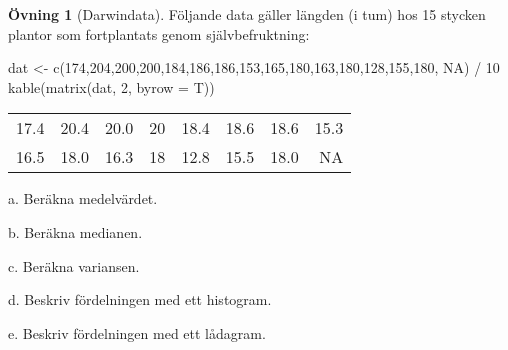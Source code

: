 \documentclass[
]{book}
\newenvironment{Shaded}{\begin{snugshade}}{\end{snugshade}}
\newcommand{\AttributeTok}[1]{\textcolor[rgb]{0.77,0.63,0.00}{#1}}
\newcommand{\ConstantTok}[1]{\textcolor[rgb]{0.00,0.00,0.00}{#1}}
\newcommand{\DecValTok}[1]{\textcolor[rgb]{0.00,0.00,0.81}{#1}}
\newcommand{\FunctionTok}[1]{\textcolor[rgb]{0.00,0.00,0.00}{#1}}
\newcommand{\NormalTok}[1]{#1}
\newcommand{\OtherTok}[1]{\textcolor[rgb]{0.56,0.35,0.01}{#1}}
\newcommand{\SpecialCharTok}[1]{\textcolor[rgb]{0.00,0.00,0.00}{#1}}
\theoremstyle{definition}
\theoremstyle{definition}
\theoremstyle{definition}
\newtheorem{exercise}{Övning}[chapter]
\theoremstyle{definition}
\theoremstyle{remark}
\begin{document}
\begin{exercise}[Darwindata]
Följande data gäller längden (i tum) hos 15 stycken plantor som fortplantats genom självbefruktning:

\begin{Shaded}
\begin{Highlighting}[]
\NormalTok{dat }\OtherTok{\textless{}{-}} \FunctionTok{c}\NormalTok{(}\DecValTok{174}\NormalTok{,}\DecValTok{204}\NormalTok{,}\DecValTok{200}\NormalTok{,}\DecValTok{200}\NormalTok{,}\DecValTok{184}\NormalTok{,}\DecValTok{186}\NormalTok{,}\DecValTok{186}\NormalTok{,}\DecValTok{153}\NormalTok{,}\DecValTok{165}\NormalTok{,}\DecValTok{180}\NormalTok{,}\DecValTok{163}\NormalTok{,}\DecValTok{180}\NormalTok{,}\DecValTok{128}\NormalTok{,}\DecValTok{155}\NormalTok{,}\DecValTok{180}\NormalTok{, }\ConstantTok{NA}\NormalTok{) }\SpecialCharTok{/} \DecValTok{10}
\FunctionTok{kable}\NormalTok{(}\FunctionTok{matrix}\NormalTok{(dat, }\DecValTok{2}\NormalTok{, }\AttributeTok{byrow =}\NormalTok{ T))}
\end{Highlighting}
\end{Shaded}

\begin{table}
\centering
\begin{tabular}[t]{rrrrrrrr}
\toprule
17.4 & 20.4 & 20.0 & 20 & 18.4 & 18.6 & 18.6 & 15.3\\
16.5 & 18.0 & 16.3 & 18 & 12.8 & 15.5 & 18.0 & NA\\
\bottomrule
\end{tabular}
\end{table}

a. Beräkna medelvärdet.

b. Beräkna medianen.

c. Beräkna variansen.

d. Beskriv fördelningen med ett histogram.

e. Beskriv fördelningen med ett lådagram.
\end{exercise}
\end{document}
